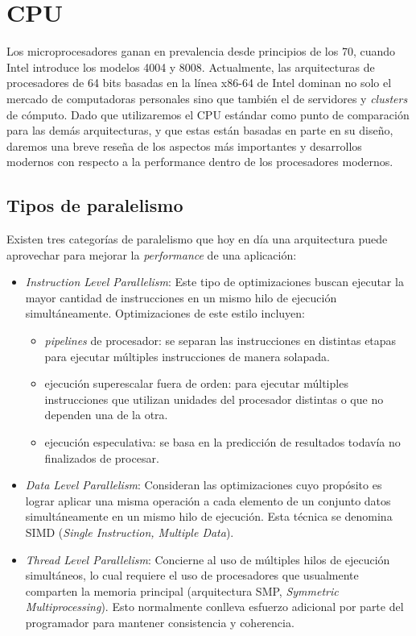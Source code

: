 \section{CPU}

Los microprocesadores ganan en prevalencia desde principios de los 70, cuando Intel introduce los modelos 4004 y 8008.
Actualmente, las arquitecturas de procesadores de 64 bits basadas en la l\'inea x86-64 de Intel dominan no solo el mercado de computadoras personales sino que tambi\'en el de servidores y \textit{clusters} de c\'omputo.
Dado que utilizaremos el CPU est\'andar como punto de comparaci\'on para las dem\'as arquitecturas, y que estas est\'an basadas en parte en su dise\~no, daremos una breve rese\~na de los aspectos m\'as importantes y desarrollos modernos con respecto a la performance dentro de los procesadores modernos.

\subsection{Tipos de paralelismo}

Existen tres categor\'ias de paralelismo que hoy en d\'ia una arquitectura puede aprovechar para mejorar la \textit{performance} de una aplicaci\'on:
\begin{itemize}
    \item \textit{Instruction Level Parallelism}: Este tipo de optimizaciones buscan
    ejecutar la mayor cantidad de instrucciones en un mismo hilo de ejecuci\'on simult\'aneamente.
    Optimizaciones de este estilo incluyen:
    \begin{itemize}
      \item \textit{pipelines} de procesador: se separan las instrucciones en distintas etapas para ejecutar m\'ultiples instrucciones de manera solapada.

      \item ejecuci\'on superescalar fuera de orden: para ejecutar m\'ultiples instrucciones que utilizan unidades del procesador distintas o que no dependen una de la otra.

      \item ejecuci\'on especulativa: se basa en la predicci\'on de resultados todav\'ia no finalizados de procesar.
    \end{itemize}

    \item \textit{Data Level Parallelism}: Consideran las optimizaciones cuyo prop\'osito es lograr aplicar una misma operaci\'on a cada elemento de un conjunto datos simult\'aneamente
    en un mismo hilo de ejecuci\'on. Esta t\'ecnica se denomina SIMD (\textit{Single Instruction, Multiple Data}).

    \item \textit{Thread Level Parallelism}: Concierne al uso de m\'ultiples hilos de ejecuci\'on simult\'aneos, lo cual requiere el uso de procesadores que usualmente
    comparten la memoria principal (arquitectura SMP, \textit{Symmetric Multiprocessing}).
    Esto normalmente conlleva esfuerzo adicional por parte del programador para mantener consistencia y coherencia.
\end{itemize}

